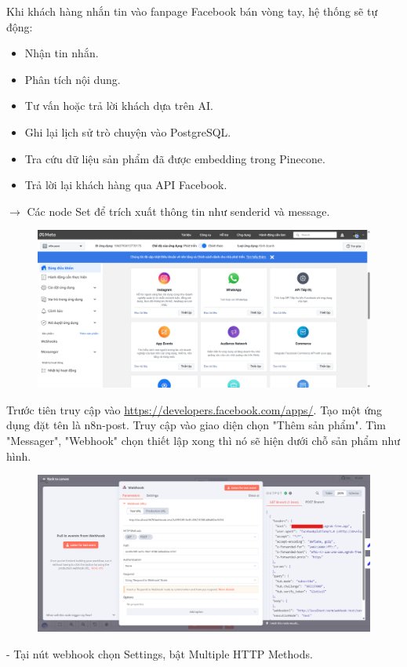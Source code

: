 Khi khách hàng nhắn tin vào fanpage Facebook bán vòng tay, hệ thống sẽ tự động:

\begin{itemize}
    \item Nhận tin nhắn.

    \item Phân tích nội dung.

    \item Tư vấn hoặc trả lời khách dựa trên AI.

    \item Ghi lại lịch sử trò chuyện vào PostgreSQL.

    \item Tra cứu dữ liệu sản phẩm đã được embedding trong Pinecone.

    \item Trả lời lại khách hàng qua API Facebook.
\end{itemize}

$\rightarrow$ Các node Set để trích xuất thông tin như senderid và message.

\newpage

\begin{figure}[htbp]
    \centering
    \includegraphics[width=1\linewidth]{Chap1-7/dev-fb.pdf}
\end{figure}

Trước tiên truy cập vào \href{https://developers.facebook.com/apps/}{https://developers.facebook.com/apps/}. Tạo một ứng dụng đặt tên là n8n-post. Truy cập vào giao diện chọn "Thêm sản phẩm". Tìm "Messager", "Webhook" chọn thiết lập xong thì nó sẽ hiện dưới chỗ sản phẩm như hình.

\begin{figure}[htbp]
    \centering
    \includegraphics[width=1\linewidth]{Chap1-7/webhook1.pdf}
\end{figure}
- Tại nút webhook chọn Settings, bật Multiple HTTP Methods.

